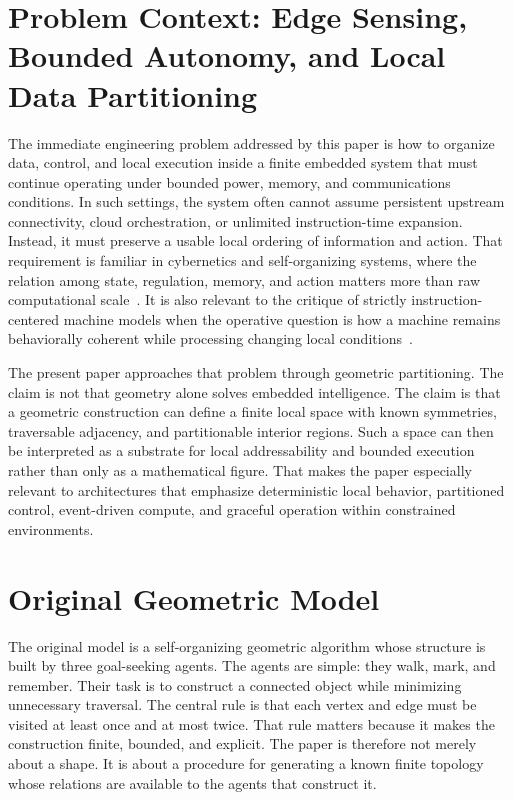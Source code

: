 \documentclass[11pt]{article}
\begin{document}
\section{Problem Context: Edge Sensing, Bounded Autonomy, and Local Data Partitioning}

The immediate engineering problem addressed by this paper is how to organize
data, control, and local execution inside a finite embedded system that must
continue operating under bounded power, memory, and communications conditions.
In such settings, the system often cannot assume persistent upstream
connectivity, cloud orchestration, or unlimited instruction-time expansion.
Instead, it must preserve a usable local ordering of information and action.
That requirement is familiar in cybernetics and self-organizing systems, where
the relation among state, regulation, memory, and action matters more than raw
computational scale~\cite{ashby1957,guerin2004}. It is also relevant to the
critique of strictly instruction-centered machine models when the operative
question is how a machine remains behaviorally coherent while processing
changing local conditions~\cite{vonneumann1966,hartenstein2008}.

The present paper approaches that problem through geometric partitioning. The
claim is not that geometry alone solves embedded intelligence. The claim is
that a geometric construction can define a finite local space with known
symmetries, traversable adjacency, and partitionable interior regions. Such a
space can then be interpreted as a substrate for local addressability and
bounded execution rather than only as a mathematical figure. That makes the
paper especially relevant to architectures that emphasize deterministic local
behavior, partitioned control, event-driven compute, and graceful operation
within constrained environments.

\section{Original Geometric Model}

The original model is a self-organizing geometric algorithm whose structure is
built by three goal-seeking agents. The agents are simple: they walk, mark, and
remember. Their task is to construct a connected object while minimizing
unnecessary traversal. The central rule is that each vertex and edge must be
visited at least once and at most twice. That rule matters because it makes the
construction finite, bounded, and explicit. The paper is therefore not merely
about a shape. It is about a procedure for generating a known finite topology
whose relations are available to the agents that construct it.
\end{document}
